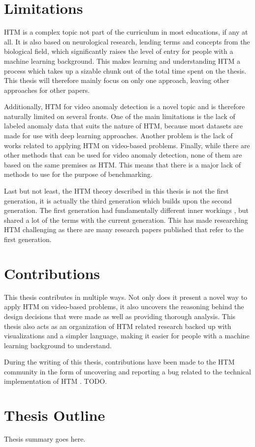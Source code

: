 \section{Limitations}
HTM is a complex topic not part of the curriculum in most educations, if any at all. It is also based on neurological research, lending terms and concepts from the biological field, which significantly raises the level of entry for people with a machine learning background. This makes learning and understanding HTM a process which takes up a sizable chunk out of the total time spent on the thesis. This thesis will  therefore mainly focus on only one approach, leaving other approaches for other papers.\par
Additionally, HTM for video anomaly detection is a novel topic and is therefore naturally limited on several fronts. One of the main limitations is the lack of labeled anomaly data that suits the nature of HTM, because most datasets are made for use with deep learning approaches. Another problem is the lack of works related to applying HTM on video-based problems. Finally, while there are other methods that can be used for video anomaly detection, none of them are based on the same premises as HTM. This means that there is a major lack of methods to use for the purpose of benchmarking.
\par
Last but not least, the HTM theory described in this thesis is not the first generation, it is actually the third generation which builds upon the second generation. The first generation had fundamentally different inner workings \cite{htm_zeta1}, but shared a lot of the terms with the current generation. This has made researching HTM challenging as there are many research papers published that refer to the first generation.
\section{Contributions}
This thesis contributes in multiple ways. Not only does it present a novel way to apply HTM on video-based problems, it also uncovers the reasoning behind the design decisions that were made as well as providing thorough analysis. This thesis also acts as an organization of HTM related research backed up with visualizations and a simpler language, making it easier for people with a machine learning background to understand.
\par
During the writing of this thesis, contributions have been made to the HTM community in the form of uncovering and reporting a bug related to the technical implementation of HTM \cite{github_contrib}. TODO.
\section{Thesis Outline}
Thesis summary goes here.
